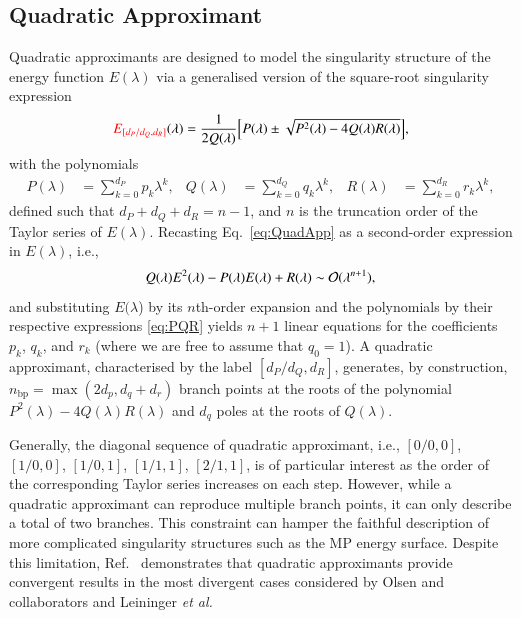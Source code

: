 \documentclass[aps,prb,reprint,noshowkeys,superscriptaddress]{revtex4-1}
\newcommand{\titou}[1]{\textcolor{red}{#1}}
\newcommand{\latin}[1]{#1}
\newcommand{\ie}{\latin{i.e.}}
\newcommand{\etal}{\textit{et al.}}
\begin{document}
\subsection{Quadratic Approximant}
Quadratic approximants are designed to model the singularity structure of the energy 
function $E(\lambda)$ via a generalised version of the square-root singularity 
expression \cite{Mayer_1985,Goodson_2011,Goodson_2019}
\begin{equation}
	\label{eq:QuadApp}
	\titou{E_{[d_P/d_Q,d_R]}}(\lambda) = \frac{1}{2 Q(\lambda)} \qty[ P(\lambda) \pm \sqrt{P^2(\lambda) - 4 Q(\lambda) R(\lambda)} ],
\end{equation}
with the polynomials 
\begin{align}
	\label{eq:PQR}
	P(\lambda) & = \sum_{k=0}^{d_P} p_k \lambda^k,
	&
	Q(\lambda) & = \sum_{k=0}^{d_Q} q_k \lambda^k, 
	&
	R(\lambda) & = \sum_{k=0}^{d_R} r_k \lambda^k,
\end{align}
defined such that $d_P + d_Q + d_R = n - 1$, and $n$ is the truncation order of the Taylor series of $E(\lambda)$.
Recasting Eq.~\eqref{eq:QuadApp} as a second-order expression in $E(\lambda)$, \ie,
\begin{equation}
	Q(\lambda) E^2(\lambda) - P(\lambda) E(\lambda) + R(\lambda) \sim \order*{\lambda^{n+1}},
\end{equation}
and substituting $E(\lambda$) by its $n$th-order expansion and the polynomials by 
their respective expressions \eqref{eq:PQR} yields $n+1$ linear equations for the coefficients 
$p_k$, $q_k$, and $r_k$ (where we are free to assume that $q_0 = 1$).
A quadratic approximant, characterised by the label $[d_P/d_Q,d_R]$, generates, by construction, 
$n_\text{bp} = \max(2d_p,d_q+d_r)$ branch points at the roots of the polynomial 
$P^2(\lambda) - 4 Q(\lambda) R(\lambda)$ and $d_q$ poles at the roots of $Q(\lambda)$.

Generally, the diagonal sequence of quadratic approximant, 
\ie, $[0/0,0]$, $[1/0,0]$, $[1/0,1]$, $[1/1,1]$, $[2/1,1]$, 
is of particular interest as the order of the corresponding Taylor series increases on each step.
However, while a quadratic approximant can reproduce multiple branch points, it can only describe 
a total of two branches.
This constraint
can hamper the faithful description of more complicated singularity structures such as the MP energy surface.
Despite this limitation, Ref.~ demonstrates that quadratic approximants 
provide convergent results in the most divergent cases considered by Olsen and 
collaborators\cite{Christiansen_1996,Olsen_1996} 
and Leininger \etal \cite{Leininger_2000}
\end{document}
